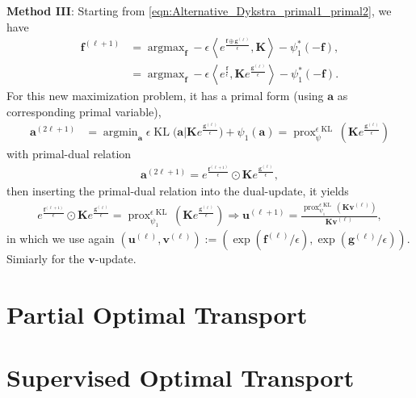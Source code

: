 \documentclass[11pt]{book}
\newcommand{\prox}{\operatorname{prox}}
\newcommand{\KL}{\operatorname{KL}}
\newcommand{\argmin}{\operatorname{argmin}}
\newcommand{\argmax}{\operatorname{argmax}}
\begin{document}
{\bf Method III}: Starting from \eqref{eqn:Alternative_Dykstra_primal1_primal2}, we have
\begin{align*}
    \mathbf{f}^{(\ell+1)} &= \argmax_{\mathbf{f}} -\epsilon \left\langle e^{\frac{\mathbf{f}\oplus\mathbf{g}^{(\ell)}}{\epsilon}}, \mathbf{K} \right\rangle  - \psi_1^*(-\mathbf{f}), \\
    &= \argmax_{\mathbf{f}} -\epsilon \left\langle e^{\frac{\mathbf{f}}{\epsilon}}, \mathbf{K} e^{\frac{\mathbf{g}^{(\ell)}}{\epsilon}} \right\rangle  - \psi_1^*(-\mathbf{f}).
\end{align*}
For this new maximization problem, it has a primal form (using $\mathbf{a}$ as corresponding primal variable),
\begin{align*}
    \mathbf{a}^{(2\ell+1)} &= \argmin_{\mathbf{a}} \epsilon \KL \Big(\mathbf{a} | \mathbf{K} e^{\frac{\mathbf{g}^{(\ell)}}{\epsilon}}  \Big) + \psi_1(\mathbf{a}) = \prox_{\psi}^{\epsilon\KL} \left( \mathbf{K} e^{\frac{\mathbf{g}^{(\ell)}}{\epsilon}} \right)
\end{align*}
with primal-dual relation
\begin{align*}
    \mathbf{a}^{(2\ell+1)} = e^{\frac{\mathbf{f}^{(\ell+1)}}{\epsilon}} \odot \mathbf{K} e^{\frac{\mathbf{g}^{(\ell)}}{\epsilon}},
\end{align*}
then inserting the primal-dual relation into the dual-update, it yields
\begin{align*}
    e^{\frac{\mathbf{f}^{(\ell+1)}}{\epsilon}} \odot \mathbf{K} e^{\frac{\mathbf{g}^{(\ell)}}{\epsilon}} =
    \prox_{\psi_1}^{\epsilon\KL} \left( \mathbf{K} e^{\frac{\mathbf{g}^{(\ell)}}{\epsilon}} \right)
    \Longrightarrow 
    \mathbf{u}^{(\ell+1)} = \frac{ \prox_{\psi_1}^{\epsilon\KL}(\mathbf{K}\mathbf{v}^{(\ell)}) }{\mathbf{K}\mathbf{v}^{(\ell)}},
\end{align*}
in which we use again $(\mathbf{u}^{(\ell)}, \mathbf{v}^{(\ell)}) := ( \exp(\mathbf{f}^{(\ell)}/\epsilon) , \exp(\mathbf{g}^{(\ell)}/\epsilon) )$. Simiarly for the $\mathbf{v}$-update.



\section[Partial OT]{Partial Optimal Transport}










\section[Supervised OT]{Supervised Optimal Transport}
\end{document}
